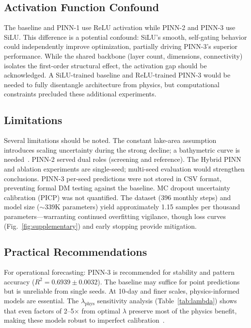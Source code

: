 \documentclass[conference,a4paper]{IEEEtran}
\begin{document}
\subsection{Activation Function Confound}
\label{sec:limitations}

The baseline and PINN-1 use ReLU activation while PINN-2 and PINN-3 use SiLU. This difference is a potential confound: SiLU's smooth, self-gating behavior could independently improve optimization, partially driving PINN-3's superior performance. While the shared backbone (layer count, dimensions, connectivity) isolates the first-order structural effect, the activation gap should be acknowledged. A SiLU-trained baseline and ReLU-trained PINN-3 would be needed to fully disentangle architecture from physics, but computational constraints precluded these additional experiments.

\subsection{Limitations}
Several limitations should be noted. The constant lake-area assumption introduces scaling uncertainty during the strong decline; a bathymetric curve is needed~\cite{samant2023climate}. PINN-2 served dual roles (screening and reference). The Hybrid PINN and ablation experiments are single-seed; multi-seed evaluation would strengthen conclusions. PINN-3 per-seed predictions were not stored in CSV format, preventing formal DM testing against the baseline. MC dropout uncertainty calibration (PICP) was not quantified. The dataset (396 monthly steps) and model size (${\sim}339$K parameters) yield approximately 1.15 samples per thousand parameters---warranting continued overfitting vigilance, though loss curves (Fig.~\ref{fig:supplementary}) and early stopping provide mitigation.

\subsection{Practical Recommendations}
For operational forecasting: PINN-3 is recommended for stability and pattern accuracy ($R^2{=}0.6939{\pm}0.0032$). The baseline may suffice for point predictions but is unreliable from single seeds. At 10-day and finer scales, physics-informed models are essential. The $\lambda_{\text{phys}}$ sensitivity analysis (Table~\ref{tab:lambda}) shows that even factors of 2--5$\times$ from optimal $\lambda$ preserve most of the physics benefit, making these models robust to imperfect calibration~\cite{raissi2019physics}.
\end{document}

